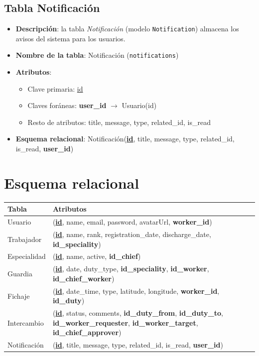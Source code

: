 \subsection{Tabla Notificación}
\begin{itemize}
    \item \textbf{Descripción}: la tabla \textit{Notificación} (modelo \texttt{Notification}) almacena los avisos del sistema para los usuarios.
    \item \textbf{Nombre de la tabla}: Notificación (\texttt{notifications})
    \item \textbf{Atributos}:
    \begin{itemize}
        \item Clave primaria: \underline{id}
        \item Claves foráneas: \textbf{user\_id} $\rightarrow$ Usuario(id)
        \item Resto de atributos: title, message, type, related\_id, is\_read
    \end{itemize}
    \item \textbf{Esquema relacional}: Notificación(\textbf{\underline{id}}, title, message, type, related\_id, is\_read, \textbf{user\_id})
\end{itemize}

 \section{Esquema relacional}\label{sec:esquema-relacional}

\begin{table}[H]
\begin{center}
    \begin{tabular}{|l|p{8cm}|}
    \hline
    Tabla                 &   Atributos \\ \hline
    Usuario             &   (\textbf{\underline{id}}, name, email, password, avatarUrl, \textbf{worker\_id}) \\ \hline
    Trabajador          &   (\textbf{\underline{id}}, name, rank, registration\_date, discharge\_date, \textbf{id\_speciality}) \\ \hline
    Especialidad        &   (\textbf{\underline{id}}, name, active, \textbf{id\_chief}) \\ \hline
    Guardia             &   (\textbf{\underline{id}}, date, duty\_type, \textbf{id\_speciality}, \textbf{id\_worker}, \textbf{id\_chief\_worker}) \\ \hline
    Fichaje             &   (\textbf{\underline{id}}, date\_time, type, latitude, longitude, \textbf{worker\_id}, \textbf{id\_duty}) \\ \hline
    Intercambio         &   (\textbf{\underline{id}}, status, comments, \textbf{id\_duty\_from}, \textbf{id\_duty\_to}, \textbf{id\_worker\_requester}, \textbf{id\_worker\_target}, \textbf{id\_chief\_approver}) \\ \hline
    Notificación        &   (\textbf{\underline{id}}, title, message, type, related\_id, is\_read, \textbf{user\_id}) \\ \hline
    \end{tabular}
\end{center}
\end{table}

